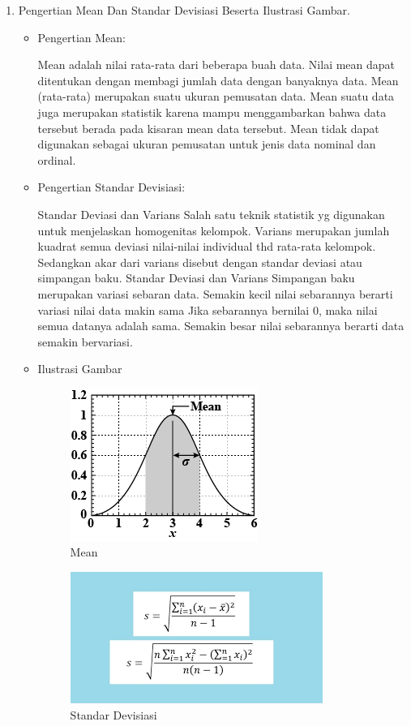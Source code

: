 \begin{enumerate}
\begin{itemize}
\end{itemize}

\item Pengertian Mean Dan Standar Devisiasi Beserta Ilustrasi Gambar.
\begin{itemize}
\item  Pengertian Mean:

Mean adalah nilai rata-rata dari beberapa buah data. Nilai mean dapat ditentukan dengan membagi jumlah data dengan banyaknya data. Mean (rata-rata) merupakan suatu ukuran pemusatan data. Mean suatu data juga merupakan statistik karena mampu menggambarkan bahwa data tersebut berada pada kisaran mean data tersebut. Mean tidak dapat digunakan sebagai ukuran pemusatan untuk jenis data nominal dan ordinal.

\item  Pengertian Standar Devisiasi:

Standar Deviasi dan Varians Salah satu teknik statistik yg digunakan untuk menjelaskan homogenitas kelompok. Varians merupakan jumlah kuadrat semua deviasi nilai-nilai individual thd rata-rata kelompok. Sedangkan akar dari varians disebut dengan standar deviasi atau simpangan baku. Standar Deviasi dan Varians Simpangan baku merupakan variasi sebaran data. Semakin kecil nilai sebarannya berarti variasi nilai data makin sama Jika sebarannya bernilai 0, maka nilai semua datanya adalah sama. Semakin besar nilai sebarannya berarti data semakin bervariasi.

\item Ilustrasi Gambar

\begin{figure}[H]
\centering
\includegraphics[scale=0.7]{figures/1174051/5/2.png}
\caption{Mean}
\label{Mean}
\end{figure}

\begin{figure}[H]
\centering
\includegraphics[scale=0.7]{figures/1174051/5/3.png}
\caption{Standar Devisiasi}
\label{Standar Devisiasi}
\end{figure}


\end{itemize}
\end{enumerate}
